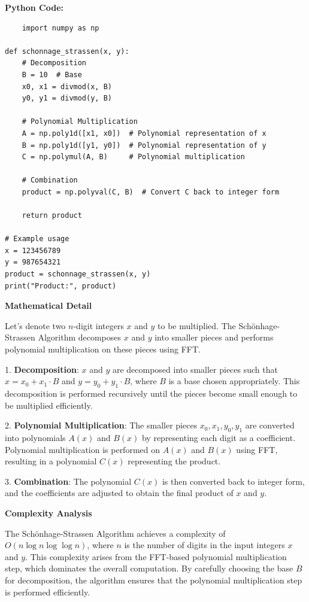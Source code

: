 \documentclass[12pt]{book} %
\begin{document}
\textbf{Python Code:}
\FloatBarrier
\begin{lstlisting}
    import numpy as np

def schonnage_strassen(x, y):
    # Decomposition
    B = 10  # Base
    x0, x1 = divmod(x, B)
    y0, y1 = divmod(y, B)
    
    # Polynomial Multiplication
    A = np.poly1d([x1, x0])  # Polynomial representation of x
    B = np.poly1d([y1, y0])  # Polynomial representation of y
    C = np.polymul(A, B)     # Polynomial multiplication
    
    # Combination
    product = np.polyval(C, B)  # Convert C back to integer form
    
    return product

# Example usage
x = 123456789
y = 987654321
product = schonnage_strassen(x, y)
print("Product:", product)
\end{lstlisting}

\textbf{Mathematical Detail}

Let's denote two \(n\)-digit integers \(x\) and \(y\) to be multiplied. The Schönhage-Strassen Algorithm decomposes \(x\) and \(y\) into smaller pieces and performs polynomial multiplication on these pieces using FFT.

1. \textbf{Decomposition}: \(x\) and \(y\) are decomposed into smaller pieces such that \(x = x_0 + x_1 \cdot B\) and \(y = y_0 + y_1 \cdot B\), where \(B\) is a base chosen appropriately. This decomposition is performed recursively until the pieces become small enough to be multiplied efficiently.

2. \textbf{Polynomial Multiplication}: The smaller pieces \(x_0, x_1, y_0, y_1\) are converted into polynomials \(A(x)\) and \(B(x)\) by representing each digit as a coefficient. Polynomial multiplication is performed on \(A(x)\) and \(B(x)\) using FFT, resulting in a polynomial \(C(x)\) representing the product.

3. \textbf{Combination}: The polynomial \(C(x)\) is then converted back to integer form, and the coefficients are adjusted to obtain the final product of \(x\) and \(y\).

\textbf{Complexity Analysis}

The Schönhage-Strassen Algorithm achieves a complexity of \(O(n \log n \log \log n)\), where \(n\) is the number of digits in the input integers \(x\) and \(y\). This complexity arises from the FFT-based polynomial multiplication step, which dominates the overall computation. By carefully choosing the base \(B\) for decomposition, the algorithm ensures that the polynomial multiplication step is performed efficiently.
\end{document}
